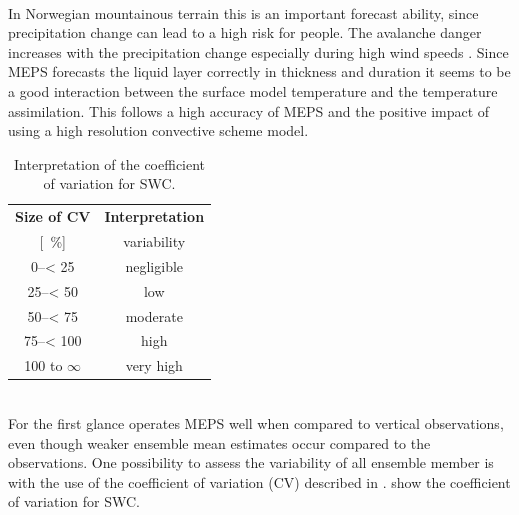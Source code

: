 \\
In Norwegian mountainous terrain this is an important forecast ability, since precipitation change can lead to a high risk for people. The avalanche danger increases with the precipitation change especially during high wind speeds \citep{hansen_warmer_2014}. Since MEPS forecasts the liquid layer correctly in thickness and duration it seems to be a good interaction between the surface model temperature and the temperature assimilation. 
This follows a high accuracy of MEPS and the positive impact of using a high resolution convective scheme model.
\\
\begin{table}[t!]
	\begin{center}
		\caption{Interpretation of the coefficient of variation for SWC.} \label{tab:verification}
		\begin{tabular}{lc|c}
			\hline\hline
			\multicolumn{2}{c|}{\textbf{Size of CV}} & {\textbf{Interpretation}} \\ 
			\multicolumn{2}{c|}{[\SI{}{\percent}]} & variability \\ \hline \hline 
			\multicolumn{2}{c|}{\numrange{0}{< 25}} & negligible  \\ \hline
			\multicolumn{2}{c|}{\numrange{25}{< 50}} & low \\ \hline
			\multicolumn{2}{c|}{\numrange{50}{< 75}} & moderate \\ \hline
			\multicolumn{2}{c|}{\numrange{75}{< 100}} & high \\ \hline
			\multicolumn{2}{c|}{\num{100} to $\infty$} & very high  \\ \hline \hline
		\end{tabular}
	\end{center}
\end{table}
\noindent
\\
For the first glance operates MEPS well when compared to vertical observations, even though weaker ensemble mean estimates occur compared to the observations. One possibility to assess the variability of all ensemble member is with the use of the coefficient of variation (CV) described in . 
 show the coefficient of variation for SWC. 
